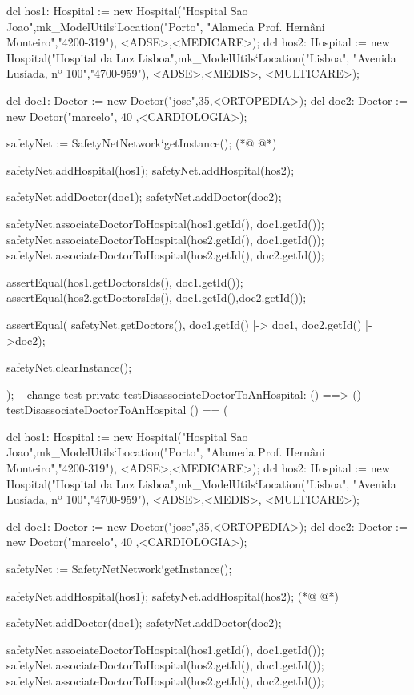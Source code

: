 \begin{vdmpp}[breaklines=true]
  dcl hos1: Hospital := new Hospital("Hospital Sao Joao",mk_ModelUtils`Location("Porto", "Alameda Prof. Hernâni Monteiro","4200-319"), {<ADSE>,<MEDICARE>});
  dcl hos2: Hospital := new Hospital("Hospital da Luz Lisboa",mk_ModelUtils`Location("Lisboa", "Avenida Lusíada, nº 100","4700-959"), {<ADSE>,<MEDIS>, <MULTICARE>}); 
  
  dcl doc1: Doctor := new Doctor("jose",35,<ORTOPEDIA>);
  dcl doc2: Doctor := new Doctor("marcelo", 40 ,<CARDIOLOGIA>);
  
  safetyNet := SafetyNetNetwork`getInstance();
(*@
\label{testDisassociateDoctorToAnHospital:262}
@*)
   
  safetyNet.addHospital(hos1);
  safetyNet.addHospital(hos2);
  
  safetyNet.addDoctor(doc1);
  safetyNet.addDoctor(doc2);

  safetyNet.associateDoctorToHospital(hos1.getId(), doc1.getId());
  safetyNet.associateDoctorToHospital(hos2.getId(), doc1.getId());
  safetyNet.associateDoctorToHospital(hos2.getId(), doc2.getId());
  
  assertEqual(hos1.getDoctorsIds(), {doc1.getId()});
  assertEqual(hos2.getDoctorsIds(), {doc1.getId(),doc2.getId()});

  assertEqual( safetyNet.getDoctors(), {doc1.getId() |-> doc1, doc2.getId() |->doc2});
  
  safetyNet.clearInstance();
    
);
-- change test
private testDisassociateDoctorToAnHospital: () ==> ()
 testDisassociateDoctorToAnHospital () == (
 
  dcl hos1: Hospital := new Hospital("Hospital Sao Joao",mk_ModelUtils`Location("Porto", "Alameda Prof. Hernâni Monteiro","4200-319"), {<ADSE>,<MEDICARE>});
  dcl hos2: Hospital := new Hospital("Hospital da Luz Lisboa",mk_ModelUtils`Location("Lisboa", "Avenida Lusíada, nº 100","4700-959"), {<ADSE>,<MEDIS>, <MULTICARE>});  
  
  dcl doc1: Doctor := new Doctor("jose",35,<ORTOPEDIA>);
  dcl doc2: Doctor := new Doctor("marcelo", 40 ,<CARDIOLOGIA>);
  
  safetyNet := SafetyNetNetwork`getInstance();
   
  safetyNet.addHospital(hos1);
  safetyNet.addHospital(hos2);
(*@
\label{testGetHospitalsByLocation:295}
@*)
  
  safetyNet.addDoctor(doc1);
  safetyNet.addDoctor(doc2);

  safetyNet.associateDoctorToHospital(hos1.getId(), doc1.getId());
  safetyNet.associateDoctorToHospital(hos2.getId(), doc1.getId());
  safetyNet.associateDoctorToHospital(hos2.getId(), doc2.getId());
  

\end{vdmpp}
